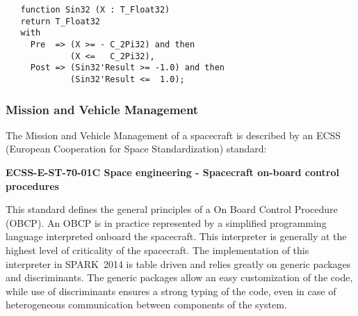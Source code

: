 \documentclass[10pt,a4paper,twocolumn]{article}
\newcommand{\newspark}{SPARK~2014\xspace}
\begin{document}
\begin{lstlisting}
   function Sin32 (X : T_Float32)
   return T_Float32
   with
     Pre  => (X >= - C_2Pi32) and then
             (X <=   C_2Pi32),
     Post => (Sin32'Result >= -1.0) and then
             (Sin32'Result <=  1.0);
\end{lstlisting}

\subsubsection{Mission and Vehicle Management}

The Mission and Vehicle Management of a spacecraft is described by an ECSS (European Cooperation for Space Standardization) standard:

\begin{center}
{\bf ECSS-E-ST-70-01C Space engineering - Spacecraft on-board control procedures}
\end{center}

This standard defines the general principles of a On Board Control Procedure
(OBCP). An OBCP is in practice represented by a simplified programming language
interpreted onboard the spacecraft. This interpreter is generally at the
highest level of criticality of the spacecraft. The implementation of this
interpreter in \newspark is table driven and relies greatly on generic packages
and discriminants. The generic packages allow an easy customization of the
code, while use of discriminants ensures a strong typing of the code, even in
case of heterogeneous communication between components of the system.








\end{document}
